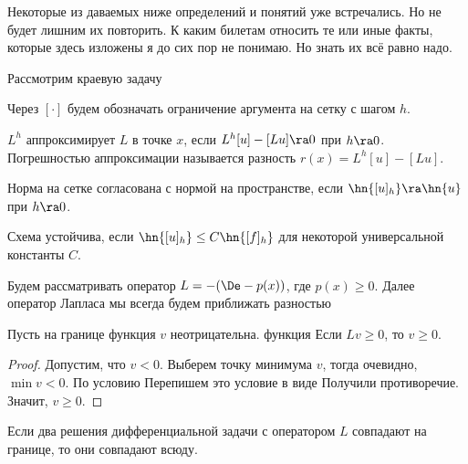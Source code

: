 \documentclass[a4paper]{article}
\begin{document}
\begin{petit}
Некоторые из даваемых ниже определений и понятий уже встречались. Но
не будет лишним их повторить.  К каким билетам относить те или иные
факты, которые здесь изложены я до сих пор не понимаю. Но знать их всё
равно надо.
\end{petit}

Рассмотрим краевую задачу 

Через $[\cdot]$ будем обозначать ограничение аргумента на сетку с
шагом $h$.

\begin{df}
$L^h$ аппроксимирует $L$ в точке $x$, если $L^h[u]- [Lu]\ra 0$ при
  $h\ra 0$.  Погрешностью аппроксимации называется разность $r(x) =
  L^h[u]-[Lu]$.
\end{df}

\begin{df}
Норма на сетке согласована с нормой на пространстве, если $\hn{[u]_h}
\ra \hn{u}$ при $h\ra 0$.
\end{df}

\begin{df}
Схема устойчива, если $\hn{[u]_h} \le C \hn{[f]_h}$ для некоторой
универсальной константы $C$.
\end{df}

Будем рассматривать оператор $L = -(\De - p(x))$, где $p(x) \ge 0$.
Далее оператор Лапласа мы всегда будем приближать разностью


\begin{theorem}
Пусть на границе функция $v$ неотрицательна. функция Если ${L v\ge
  0}$, то $v\ge 0$.
\end{theorem}
\begin{proof}
Допустим, что $v < 0$. Выберем точку минимума $v$, тогда очевидно,
$\min v < 0$.  По условию   Перепишем это условие в виде   Получили противоречие. Значит, $v \ge 0$.
\end{proof}

\begin{imp}
Если два решения дифференциальной задачи с оператором $L$ совпадают на
границе, то они совпадают всюду.
\end{imp}
\end{document}
